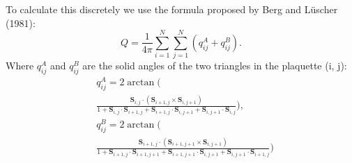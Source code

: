 To calculate this discretely we use the formula proposed by  Berg and Lüscher (1981)\cite{BERG1981412}:
\begin{equation}
	Q = \frac{1}{4\pi} \sum_{i=1}^N \sum_{j=1}^N \left( q_{ij}^A + q_{ij}^B\right).
\end{equation}
Where $q_{ij}^A $ and $ q_{ij}^B$ are the solid angles of the two triangles in the plaquette (i, j):
\begin{align}
& q_{ij}^A = {} 2\arctan\biggl( \\
& \frac{\mathbf{S}_{i,j}\cdot \left(\mathbf{S}_{i+1,j} \times \mathbf{S}_{i,j+1}\right)}
       {1 + \mathbf{S}_{i,j}\cdot\mathbf{S}_{i+1,j} + \mathbf{S}_{i+1,j}\cdot\mathbf{S}_{i,j+1} + \mathbf{S}_{i,j+1}\cdot\mathbf{S}_{i,j}}
\biggr),  \nonumber \\
& q_{ij}^B = {} 2\arctan\biggl( \\
& \frac{\mathbf{S}_{i+1,j}\cdot \left(\mathbf{S}_{i+1,j+1} \times \mathbf{S}_{i,j+1}\right)}
       {1 + \mathbf{S}_{i+1 ,j}\cdot\mathbf{S}_{i+1,j+1} + \mathbf{S}_{i+1,j+1}\cdot\mathbf{S}_{i,j+1} + \mathbf{S}_{i,j+1}\cdot\mathbf{S}_{i+1,j}}
\biggr) \nonumber
\end{align}
	



